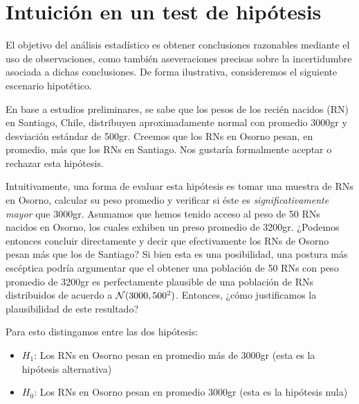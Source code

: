 \section{Intuición en un test de hipótesis} 
\label{sec:int_hipótesis}

El objetivo del análisis estadístico es obtener conclusiones razonables mediante el uso de observaciones, como también aseveraciones precisas sobre la incertidumbre asociada a dichas conclusiones. De forma ilustrativa, consideremos el siguiente escenario hipotético.

En base a estudios preliminares, se sabe que los pesos de los recién nacidos (RN) en Santiago, Chile, distribuyen aproximadamente normal con promedio 3000gr y desviación estándar de 500gr. Creemos que los RNs en Osorno pesan, en promedio, más que los RNs en Santiago. Nos gustaría formalmente aceptar o rechazar esta hipótesis. 

Intuitivamente, una forma de evaluar esta hipótesis es tomar una muestra de RNs en Osorno, calcular su peso promedio y verificar si éste es \textit{significativamente mayor} que 3000gr. Asumamos que hemos tenido acceso al peso de 50 RNs nacidos en Osorno, los cuales exhiben un preso promedio de 3200gr. ¿Podemos entonces concluir directamente y decir que efectivamente los RNs de Osorno pesan más que los de Santiago?  Si bien esta es una posibilidad, una postura más escéptica podría argumentar que el obtener una población de 50 RNs con peso promedio de 3200gr es perfectamente plausible de una población de RNs distribuidos de acuerdo a ${\mathcal N}(3000,500^2)$. Entonces, ¿cómo justificamos la plausibilidad de este resultado?

Para esto distingamos entre las dos hipótesis: 

\begin{itemize}
	\item $H_1$: Los RNs en Osorno pesan en promedio más de 3000gr (esta es la hipótesis alternativa)
	\item $H_0$: Los RNs en Osorno pesan en promedio 3000gr (esta es la hipótesis nula)
\end{itemize}

